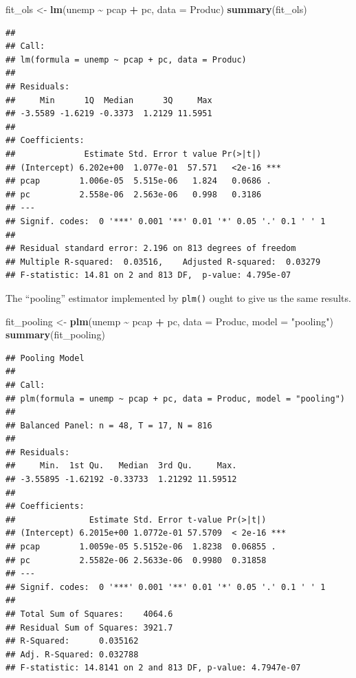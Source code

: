 \documentclass[
  12pt,
  oneside,openany]{book}
\newenvironment{Shaded}{\begin{snugshade}}{\end{snugshade}}
\newcommand{\DataTypeTok}[1]{\textcolor[rgb]{0.13,0.29,0.53}{#1}}
\newcommand{\KeywordTok}[1]{\textcolor[rgb]{0.13,0.29,0.53}{\textbf{#1}}}
\newcommand{\NormalTok}[1]{#1}
\newcommand{\OperatorTok}[1]{\textcolor[rgb]{0.81,0.36,0.00}{\textbf{#1}}}
\newcommand{\StringTok}[1]{\textcolor[rgb]{0.31,0.60,0.02}{#1}}
\begin{document}
\begin{Shaded}
\begin{Highlighting}[]
\NormalTok{fit\_ols <{-}}\StringTok{ }\KeywordTok{lm}\NormalTok{(unemp }\OperatorTok{\textasciitilde{}}\StringTok{ }\NormalTok{pcap }\OperatorTok{+}\StringTok{ }\NormalTok{pc,}
              \DataTypeTok{data =}\NormalTok{ Produc)}
\KeywordTok{summary}\NormalTok{(fit\_ols)}
\end{Highlighting}
\end{Shaded}

\begin{verbatim}
## 
## Call:
## lm(formula = unemp ~ pcap + pc, data = Produc)
## 
## Residuals:
##     Min      1Q  Median      3Q     Max 
## -3.5589 -1.6219 -0.3373  1.2129 11.5951 
## 
## Coefficients:
##              Estimate Std. Error t value Pr(>|t|)    
## (Intercept) 6.202e+00  1.077e-01  57.571   <2e-16 ***
## pcap        1.006e-05  5.515e-06   1.824   0.0686 .  
## pc          2.558e-06  2.563e-06   0.998   0.3186    
## ---
## Signif. codes:  0 '***' 0.001 '**' 0.01 '*' 0.05 '.' 0.1 ' ' 1
## 
## Residual standard error: 2.196 on 813 degrees of freedom
## Multiple R-squared:  0.03516,    Adjusted R-squared:  0.03279 
## F-statistic: 14.81 on 2 and 813 DF,  p-value: 4.795e-07
\end{verbatim}

The ``pooling'' estimator implemented by \texttt{plm()} ought to give us the same results.

\begin{Shaded}
\begin{Highlighting}[]
\NormalTok{fit\_pooling <{-}}\StringTok{ }\KeywordTok{plm}\NormalTok{(unemp }\OperatorTok{\textasciitilde{}}\StringTok{ }\NormalTok{pcap }\OperatorTok{+}\StringTok{ }\NormalTok{pc,}
                   \DataTypeTok{data =}\NormalTok{ Produc,}
                   \DataTypeTok{model =} \StringTok{"pooling"}\NormalTok{)}
\KeywordTok{summary}\NormalTok{(fit\_pooling)}
\end{Highlighting}
\end{Shaded}

\begin{verbatim}
## Pooling Model
## 
## Call:
## plm(formula = unemp ~ pcap + pc, data = Produc, model = "pooling")
## 
## Balanced Panel: n = 48, T = 17, N = 816
## 
## Residuals:
##     Min.  1st Qu.   Median  3rd Qu.     Max. 
## -3.55895 -1.62192 -0.33733  1.21292 11.59512 
## 
## Coefficients:
##               Estimate Std. Error t-value Pr(>|t|)    
## (Intercept) 6.2015e+00 1.0772e-01 57.5709  < 2e-16 ***
## pcap        1.0059e-05 5.5152e-06  1.8238  0.06855 .  
## pc          2.5582e-06 2.5633e-06  0.9980  0.31858    
## ---
## Signif. codes:  0 '***' 0.001 '**' 0.01 '*' 0.05 '.' 0.1 ' ' 1
## 
## Total Sum of Squares:    4064.6
## Residual Sum of Squares: 3921.7
## R-Squared:      0.035162
## Adj. R-Squared: 0.032788
## F-statistic: 14.8141 on 2 and 813 DF, p-value: 4.7947e-07
\end{verbatim}
\end{document}
